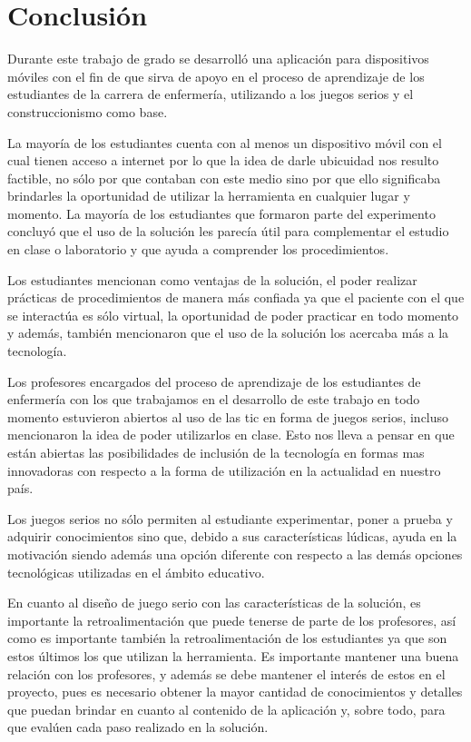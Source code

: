 \chapter{Conclusión}
\label{chap:conclusion}

Durante este trabajo de grado se desarrolló una aplicación para dispositivos
móviles con el fin de que sirva de apoyo en el proceso de aprendizaje de los
estudiantes de la carrera de enfermería, utilizando a los juegos serios y el
construccionismo como base.

La mayoría de los estudiantes cuenta con al menos un dispositivo móvil con el
cual tienen acceso a internet por lo que la idea de darle ubicuidad nos resulto
factible, no sólo por que contaban con este medio sino por que ello significaba
brindarles la oportunidad de utilizar la herramienta en cualquier lugar y
momento. La mayoría de los estudiantes que formaron parte del experimento
concluyó que el uso de la solución les parecía útil para complementar el estudio
en clase o laboratorio y que ayuda a comprender los procedimientos.

Los estudiantes mencionan como ventajas de la solución, el poder realizar
prácticas de procedimientos de manera más confiada ya que el paciente con el que
se interactúa es sólo virtual, la oportunidad de poder practicar en todo momento
y además, también mencionaron que el uso de la solución los acercaba más a la
tecnología.

Los profesores encargados del proceso de aprendizaje de los estudiantes de
enfermería con los que trabajamos en el desarrollo de este trabajo en todo
momento estuvieron abiertos al uso de las \Gls{tic} en forma de juegos serios,
incluso mencionaron la idea de poder utilizarlos en clase. Esto nos lleva a
pensar en que están abiertas las posibilidades de inclusión de la tecnología en
formas mas innovadoras con respecto a la forma de utilización en la actualidad
en nuestro país.

Los juegos serios no sólo permiten al estudiante experimentar, poner a prueba y
adquirir conocimientos sino que, debido a sus características lúdicas, ayuda en
la motivación siendo además una opción diferente con respecto a las demás
opciones tecnológicas utilizadas en el ámbito educativo.


En cuanto al diseño de juego serio con las características de la solución, es
importante la retroalimentación que puede tenerse de parte de los profesores,
así como es importante también la retroalimentación de los estudiantes ya que
son estos últimos los que utilizan la herramienta. Es importante mantener una
buena relación con los profesores, y además se debe mantener el interés de estos
en el proyecto, pues es necesario obtener la mayor cantidad de conocimientos y
detalles que puedan brindar en cuanto al contenido de la aplicación y, sobre
todo, para que evalúen cada paso realizado en la solución.

